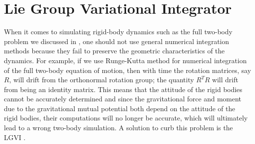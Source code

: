 \section{Lie Group Variational Integrator}
When it comes to simulating rigid-body dynamics such as the full two-body problem we discussed in , one should not use general numerical integration methods because they fail to preserve the geometric characteristics of the dynamics. For example, if we use Runge-Kutta method for numerical integration of the full two-body equation of motion, then with time the rotation matrices, say $R$, will drift from the orthonormal rotation group; the quantity $R^TR$ will drift from being an identity matrix. This means that the attitude of the rigid bodies cannot be accurately determined and since the gravitational force and moment due to the gravitational mutual potential both depend on the attitude of the rigid bodies, their computations will no longer be accurate, which will ultimately lead to a wrong two-body simulation. A solution to curb this problem is the \gls{LGVI} \cite{fahn_lgvi}.

